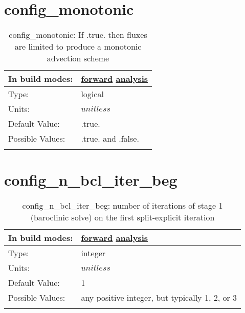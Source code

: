 \section[config\_monotonic]{config\_monotonic}
\label{sec:nm_sec_config_monotonic}
\begin{center}
\begin{longtable}{| p{2.0in} || p{4.0in} |}
    \hline
    In build modes: & \hyperref[subsec:forward_nm_tab_advection]{forward} \hyperref[subsec:analysis_nm_tab_advection]{analysis} \\
    \hline
    Type: & logical \\
    \hline
    Units: & $unitless$ \\
    \hline
    Default Value: & .true. \\
    \hline
    Possible Values: & .true. and .false. \\
    \hline
    \caption{config\_monotonic: If .true. then fluxes are limited to produce a monotonic advection scheme}
\end{longtable}
\end{center}
\section[config\_n\_bcl\_iter\_beg]{config\_n\_bcl\_iter\_beg}
\label{sec:nm_sec_config_n_bcl_iter_beg}
\begin{center}
\begin{longtable}{| p{2.0in} || p{4.0in} |}
    \hline
    In build modes: & \hyperref[subsec:forward_nm_tab_split_explicit_ts]{forward} \hyperref[subsec:analysis_nm_tab_split_explicit_ts]{analysis} \\
    \hline
    Type: & integer \\
    \hline
    Units: & $unitless$ \\
    \hline
    Default Value: & 1 \\
    \hline
    Possible Values: & any positive integer, but typically 1, 2, or 3 \\
    \hline
    \caption{config\_n\_bcl\_iter\_beg: number of iterations of stage 1 (baroclinic solve) on the first split-explicit iteration}
\end{longtable}
\end{center}
